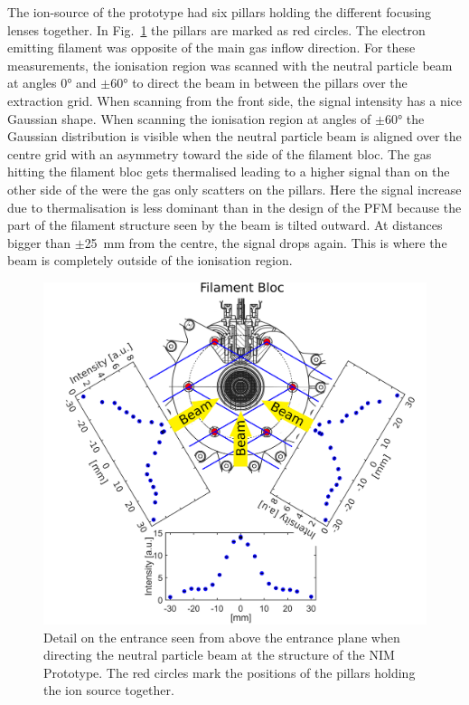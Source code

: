 	The ion-source of the prototype had six pillars holding the different focusing lenses together. In Fig.~\ref{exp:ProtoIntCharEnt} the pillars are marked as red circles. The electron emitting filament was opposite of the main gas inflow direction. For these measurements, the ionisation region was scanned with the neutral particle beam at angles 0° and $\pm$60° to direct the beam in between the pillars over the extraction grid. When scanning from the front side, the signal intensity has a nice Gaussian shape. When scanning the ionisation region at angles of $\pm$60° the Gaussian distribution is visible when the neutral particle beam is aligned over the centre grid with an asymmetry toward the side of the filament bloc. The gas hitting the filament bloc gets thermalised leading to a higher signal than on the other side of the were the gas only scatters on the pillars. Here the signal increase due to thermalisation is less dominant than in the design of the PFM because the part of the filament structure seen by the beam is tilted outward. At distances bigger than $\pm$25~mm from the centre, the signal drops again. This is where the beam is completely outside of the ionisation region.
	\begin{figure}[h!]
		\centering
		\includegraphics[width=\textwidth]{Experiments/Entrence_Proto_topview.png}
		\caption{Detail on the entrance seen from above the entrance plane when directing the neutral particle beam at the structure of the NIM Prototype. The red circles mark the positions of the pillars holding the ion source together.}
		\label{exp:ProtoIntCharEnt}
	\end{figure}
	

